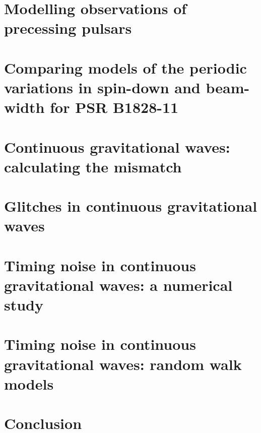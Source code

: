 \documentclass[twoside]{thesis}
\begin{document}
\chapter{Modelling observations of precessing pulsars}
\label{sec: inertial frame}


\chapter{Comparing models of the periodic variations in spin-down
and beam-width for PSR B1828-11}
\label{sec: testing models}


\chapter{Continuous gravitational waves: calculating the mismatch}
\label{sec: intro to cgw}


\chapter{Glitches in continuous gravitational waves}
\label{sec: glitches in cgw}


\chapter{Timing noise in continuous gravitational waves: a numerical study}
\label{sec: timing noise in cgw}


\chapter{Timing noise in continuous gravitational waves: random walk models}
\label{sec: timing noise in cgw analytic}


\chapter{Conclusion}
\label{sec: final conclusion}


\end{document}
